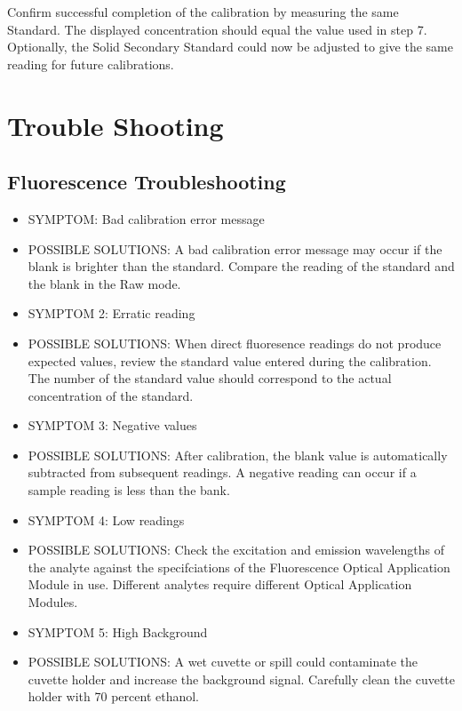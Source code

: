 \documentclass[12pt]{../SOP4_alpha}\usepackage[]{graphicx}\usepackage[]{color}
\begin{document}
\NP Confirm successful completion of the calibration by measuring the same Standard. The displayed concentration should equal the value used in step 7. Optionally, the Solid Secondary Standard could now be adjusted to give the same reading for future calibrations.



\section{Trouble Shooting}
\subsection{Fluorescence Troubleshooting}
\begin{itemize}
  \item SYMPTOM: Bad calibration error message
  \item POSSIBLE SOLUTIONS: A bad calibration error message may occur if the blank is brighter than the standard. Compare the reading of the standard and the blank in the Raw mode. 
  \item SYMPTOM 2: Erratic reading
  \item POSSIBLE SOLUTIONS: When direct fluoresence readings do not produce expected values, review the standard value entered during the calibration. The number of the standard value should correspond to the actual concentration of the standard.
  \item SYMPTOM 3: Negative values
  \item POSSIBLE SOLUTIONS: After calibration, the blank value is automatically subtracted from subsequent readings. A negative reading can occur if a sample reading is less than the bank.
  \item SYMPTOM 4: Low readings
  \item POSSIBLE SOLUTIONS: Check the excitation and emission wavelengths of the analyte against the specifciations of the Fluorescence Optical Application Module in use. Different analytes require different Optical Application Modules.
  \item SYMPTOM 5: High Background
  \item POSSIBLE SOLUTIONS: A wet cuvette or spill could contaminate the cuvette holder and increase the background signal. Carefully clean the cuvette holder with 70 percent ethanol. 
\end{itemize}
\end{document}
